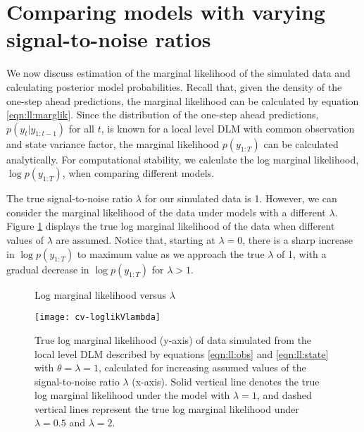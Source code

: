 \section{Comparing models with varying signal-to-noise ratios} \label{sec:comp:models}

We now discuss estimation of the marginal likelihood of the simulated data and calculating posterior model probabilities. Recall that, given the density of the one-step ahead predictions, the marginal likelihood can be calculated by equation \eqref{eqn:ll:marglik}. Since the distribution of the one-step ahead predictions, $p(y_t|y_{1:t-1})$ for all $t$, is known for a local level DLM with common observation and state variance factor, the marginal likelihood $p(y_{1:T})$ can be calculated analytically. For computational stability, we calculate the log marginal likelihood, $\log p(y_{1:T})$, when comparing different models.

The true signal-to-noise ratio $\lambda$ for our simulated data is 1. However, we can consider the marginal likelihood of the data under models with a different $\lambda$. Figure \ref{fig:comp:lambda} displays the true log marginal likelihood of the data when different values of $\lambda$ are assumed. Notice that, starting at $\lambda = 0$, there is a sharp increase in $\log p(y_{1:T})$ to maximum value as we approach the true $\lambda$ of 1, with a gradual decrease in $\log p(y_{1:T})$ for $\lambda > 1$.

\begin{figure}[ht]
\ssp
\centering
\caption{Log marginal likelihood versus $\lambda$} \label{fig:comp:lambda}
\texttt{[image: cv-loglikVlambda]}
\caption*{True log marginal likelihood (y-axis) of data simulated from the local level DLM described by equations \eqref{eqn:ll:obs} and \eqref{eqn:ll:state} with $\theta = \lambda = 1$, calculated for increasing assumed values of the signal-to-noise ratio $\lambda$ (x-axis). Solid vertical line denotes the true log marginal likelihood under the model with $\lambda = 1$, and dashed vertical lines represent the true log marginal likelihood under $\lambda = 0.5$ and $\lambda = 2$.}
\end{figure}

